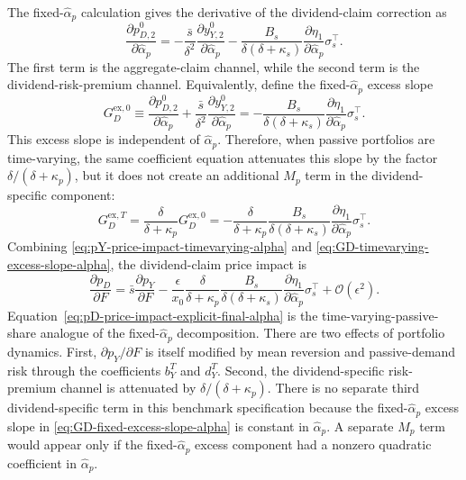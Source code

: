 The fixed-$\hat{\alpha}_p$ calculation gives the derivative of the dividend-claim correction as
\begin{equation}\label{eq:pD-fixed-alpha-decomposition-reuse}
    \frac{\partial p_{D,2}^{0}}{\partial\hat{\alpha}_p}
    =-\frac{\bar{s}}{\delta^2}\frac{\partial y_{Y,2}^{0}}{\partial\hat{\alpha}_p}
    -\frac{B_s}{\delta(\delta+\kappa_s)}
        \frac{\partial\eta_1}{\partial\hat{\alpha}_p}\sigma_s^\top.
\end{equation}
The first term is the aggregate-claim channel, while the second term is the dividend-risk-premium channel.
Equivalently, define the fixed-$\hat{\alpha}_p$ excess slope
\begin{equation}\label{eq:GD-fixed-excess-slope-alpha}
    G_D^{\mathrm{ex},0}
    \equiv
    \frac{\partial p_{D,2}^{0}}{\partial\hat{\alpha}_p}
    +\frac{\bar{s}}{\delta^2}\frac{\partial y_{Y,2}^{0}}{\partial\hat{\alpha}_p}
    =-\frac{B_s}{\delta(\delta+\kappa_s)}
        \frac{\partial\eta_1}{\partial\hat{\alpha}_p}\sigma_s^\top.
\end{equation}
This excess slope is independent of $\hat{\alpha}_p$.
Therefore, when passive portfolios are time-varying, the same coefficient equation attenuates this slope by the factor $\delta/(\delta+\kappa_p)$, but it does not create an additional $M_p$ term in the dividend-specific component:
\begin{equation}\label{eq:GD-timevarying-excess-slope-alpha}
    G_D^{\mathrm{ex},T}
    =\frac{\delta}{\delta+\kappa_p}G_D^{\mathrm{ex},0}
    =-\frac{\delta}{\delta+\kappa_p}
    \frac{B_s}{\delta(\delta+\kappa_s)}
        \frac{\partial\eta_1}{\partial\hat{\alpha}_p}\sigma_s^\top.
\end{equation}
Combining \eqref{eq:pY-price-impact-timevarying-alpha} and \eqref{eq:GD-timevarying-excess-slope-alpha}, the dividend-claim price impact is
\begin{equation}\label{eq:pD-price-impact-explicit-final-alpha}
    \frac{\partial p_D}{\partial F}
    =\bar{s}\frac{\partial p_Y}{\partial F}
    -\frac{\epsilon}{x_0}
    \frac{\delta}{\delta+\kappa_p}
    \frac{B_s}{\delta(\delta+\kappa_s)}
        \frac{\partial\eta_1}{\partial\hat{\alpha}_p}\sigma_s^\top
    +\mathcal{O}(\epsilon^2).
\end{equation}
Equation~\eqref{eq:pD-price-impact-explicit-final-alpha} is the time-varying-passive-share analogue of the fixed-$\hat{\alpha}_p$ decomposition.
There are two effects of portfolio dynamics.
First, $\partial p_Y/\partial F$ is itself modified by mean reversion and passive-demand risk through the coefficients $b_Y^T$ and $d_Y^T$.
Second, the dividend-specific risk-premium channel is attenuated by $\delta/(\delta+\kappa_p)$.
There is no separate third dividend-specific term in this benchmark specification because the fixed-$\hat{\alpha}_p$ excess slope in \eqref{eq:GD-fixed-excess-slope-alpha} is constant in $\hat{\alpha}_p$.
A separate $M_p$ term would appear only if the fixed-$\hat{\alpha}_p$ excess component had a nonzero quadratic coefficient in $\hat{\alpha}_p$.


